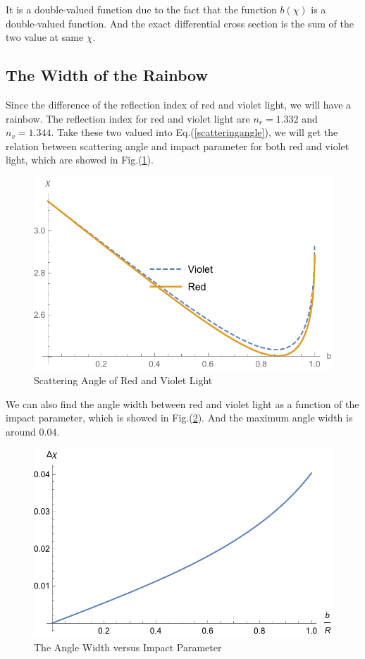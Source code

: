 \documentclass[%
 reprint,
 amsmath,amssymb,
 aps,
]{revtex4-1}
\begin{document}
It is a double-valued function due to the fact that the function $b(\chi)$ is a double-valued function. And the exact differential cross section is the sum of the two value at same $\chi$.
\subsection{The Width of the Rainbow}
Since the difference of the reflection index of red and violet light, we will have a rainbow. The reflection index for red and violet light are $n_r=1.332$ and $n_v=1.344$. Take these two valued into Eq.(\ref{scatteringangle}), we will get the relation between scattering angle and impact parameter for both red and violet light, which are showed in Fig.(\ref{redandviolet}).
\begin{figure}
    \centering
    \includegraphics[scale=0.6]{redandviolet.pdf}
    \caption{Scattering Angle of Red and Violet Light}
    \label{redandviolet}
\end{figure}
We can also find the angle width between red and violet light as a function of the impact parameter, which is showed in Fig.(\ref{anglewidth}). And the maximum angle width is around $0.04$.
\begin{figure}
    \centering
    \includegraphics[scale=0.6]{anglewidth.pdf}
    \caption{The Angle Width versus Impact Parameter}
    \label{anglewidth}
\end{figure}
\end{document}
